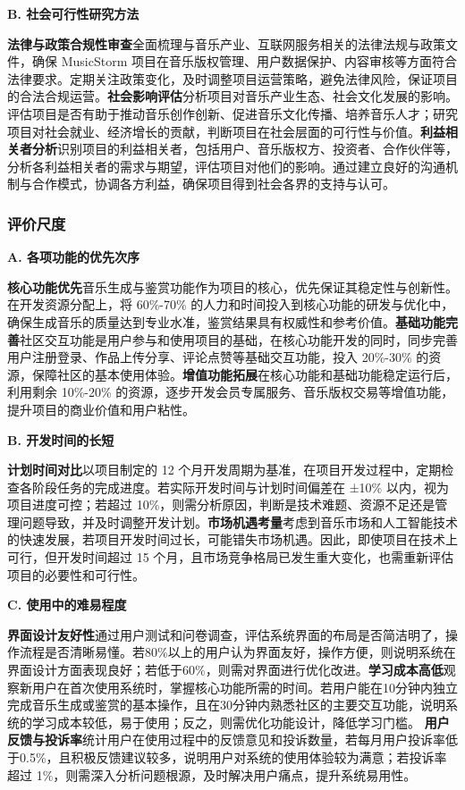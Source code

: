 \documentclass{base}
\begin{document}
\textbf{B. 社会可行性研究方法}

\textbf{法律与政策合规性审查}\quad 全面梳理与音乐产业、互联网服务相关的法律法规与政策文件，确保 MusicStorm 项目在音乐版权管理、用户数据保护、内容审核等方面符合法律要求。定期关注政策变化，及时调整项目运营策略，避免法律风险，保证项目的合法合规运营。​
\textbf{社会影响评估}\quad 分析项目对音乐产业生态、社会文化发展的影响。评估项目是否有助于推动音乐创作创新、促进音乐文化传播、培养音乐人才；研究项目对社会就业、经济增长的贡献，判断项目在社会层面的可行性与价值。​
\textbf{利益相关者分析}\quad 识别项目的利益相关者，包括用户、音乐版权方、投资者、合作伙伴等，分析各利益相关者的需求与期望，评估项目对他们的影响。通过建立良好的沟通机制与合作模式，协调各方利益，确保项目得到社会各界的支持与认可。​

\subsubsection{评价尺度}

\textbf{A. 各项功能的优先次序​}

\textbf{核心功能优先}\quad 音乐生成与鉴赏功能作为项目的核心，优先保证其稳定性与创新性。在开发资源分配上，将 60\%-70\% 的人力和时间投入到核心功能的研发与优化中，确保生成音乐的质量达到专业水准，鉴赏结果具有权威性和参考价值。​
\textbf{基础功能完善}\quad 社区交互功能是用户参与和使用项目的基础，在核心功能开发的同时，同步完善用户注册登录、作品上传分享、评论点赞等基础交互功能，投入 20\%-30\% 的资源，保障社区的基本使用体验。​
\textbf{增值功能拓展}\quad 在核心功能和基础功能稳定运行后，利用剩余 10\%-20\% 的资源，逐步开发会员专属服务、音乐版权交易等增值功能，提升项目的商业价值和用户粘性。

\textbf{B. 开发时间的长短​}

\textbf{计划时间对比}\quad 以项目制定的 12 个月开发周期为基准，在项目开发过程中，定期检查各阶段任务的完成进度。若实际开发时间与计划时间偏差在 ±10\% 以内，视为项目进度可控；若超过 10\%，则需分析原因，判断是技术难题、资源不足还是管理问题导致，并及时调整开发计划。​
\textbf{市场机遇考量}\quad 考虑到音乐市场和人工智能技术的快速发展，若项目开发时间过长，可能错失市场机遇。因此，即使项目在技术上可行，但开发时间超过 15 个月，且市场竞争格局已发生重大变化，也需重新评估项目的必要性和可行性。

\textbf{C. 使用中的难易程度}

\textbf{界面设计友好性}\quad 通过用户测试和问卷调查，评估系统界面的布局是否简洁明了，操作流程是否清晰易懂。若80\%以上的用户认为界面友好，操作方便，则说明系统在界面设计方面表现良好；若低于60\%，则需对界面进行优化改进。​
\textbf{学习成本高低}\quad 观察新用户在首次使用系统时，掌握核心功能所需的时间。若用户能在10分钟内独立完成音乐生成或鉴赏的基本操作，且在30分钟内熟悉社区的主要交互功能，说明系统的学习成本较低，易于使用；反之，则需优化功能设计，降低学习门槛。
\textbf{用户反馈与投诉率}\quad 统计用户在使用过程中的反馈意见和投诉数量，若每月用户投诉率低于0.5\%，且积极反馈建议较多，说明用户对系统的使用体验较为满意；若投诉率超过 1\%，则需深入分析问题根源，及时解决用户痛点，提升系统易用性。
\end{document}
